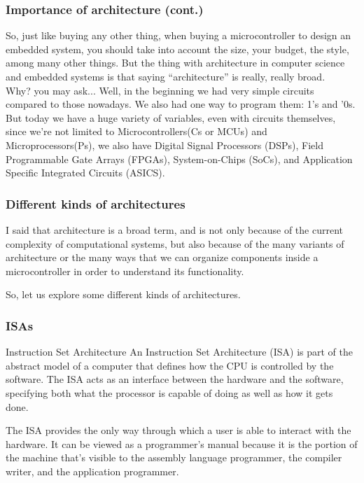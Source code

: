 \documentclass[aspectratio=169]{beamer}
\begin{document}
\begin{frame}
  \frametitle{Importance of architecture (cont.)}
  So, just like buying any other thing, when buying a microcontroller to design an embedded system, you should take into account the size, your budget, the style, among many other things. But the thing with architecture in computer science and embedded systems is that saying ``architecture'' is really, really broad. \pause \\[5mm]
  Why? you may ask... Well, in the beginning we had very simple circuits compared to those nowadays. We also had one way to program them: 1's and '0s. But today we have a huge variety of variables, even with circuits themselves, since we're not limited to Microcontrollers(\textmu Cs or MCUs) and Microprocessors(\textmu Ps), we also have Digital Signal Processors (DSPs), Field Programmable Gate Arrays (FPGAs), System-on-Chips (SoCs), and Application Specific Integrated Circuits (ASICS).  
\end{frame}

\begin{frame}
  \frametitle{Different kinds of architectures}
  I said that architecture is a broad term, and is not only because of the current complexity of computational systems, but also because of the many variants of architecture or the many ways that we can organize components inside a microcontroller in order to understand its functionality. \pause

  So, let us explore some different kinds of architectures.
\end{frame}

\begin{frame}
  \frametitle{ISAs}
    \begin{block}{Instruction Set Architecture}
      An Instruction Set Architecture (ISA) is part of the abstract model of a computer that defines how the CPU is controlled by the software. The ISA acts as an interface between the hardware and the software, specifying both what the processor is capable of doing as well as how it gets done. \cite{ISA} \pause
    \end{block} 
    The ISA provides the only way through which a user is able to interact with the hardware. It can be viewed as a programmer's manual because it is the portion of the machine that's visible to the assembly language programmer, the compiler writer, and the application programmer. 
  \end{frame}
\end{document}
